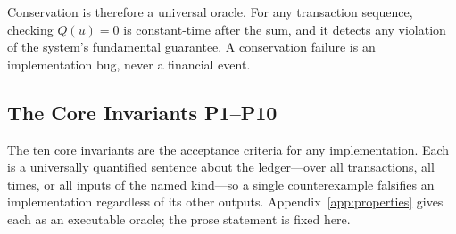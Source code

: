 Conservation is therefore a universal oracle. For any transaction sequence, checking $Q(u)=0$ is constant-time after the sum, and it detects any violation of the system's fundamental guarantee. A conservation failure is an implementation bug, never a financial event.

\subsection{The Core Invariants P1--P10}
\label{sec:invariants-core}

The ten core invariants are the acceptance criteria for any implementation. Each is a universally quantified sentence about the ledger---over all transactions, all times, or all inputs of the named kind---so a single counterexample falsifies an implementation regardless of its other outputs. Appendix~\ref{app:properties} gives each as an executable oracle; the prose statement is fixed here.

